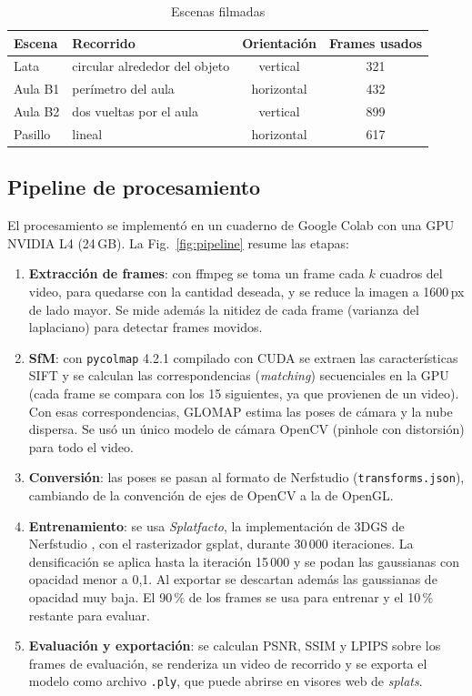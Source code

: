 \documentclass[conference,a4paper]{IEEEtran}
\begin{document}
\begin{table}[htbp]
\caption{Escenas filmadas}
\label{tab:escenas}
\centering
\begin{tabular}{@{}llcc@{}}
\toprule
Escena & Recorrido & Orientación & Frames usados \\
\midrule
Lata     & circular alrededor del objeto & vertical   & 321 \\
Aula B1  & perímetro del aula            & horizontal & 432 \\
Aula B2  & dos vueltas por el aula       & vertical   & 899 \\
Pasillo  & lineal                        & horizontal & 617 \\
\bottomrule
\end{tabular}
\end{table}

\subsection{Pipeline de procesamiento}

El procesamiento se implementó en un cuaderno de Google Colab con una GPU NVIDIA L4 (24\,GB). La Fig.~\ref{fig:pipeline} resume las etapas:

\begin{enumerate}
\item \textbf{Extracción de frames}: con ffmpeg se toma un frame cada $k$ cuadros del video, para quedarse con la cantidad deseada, y se reduce la imagen a 1600\,px de lado mayor. Se mide además la nitidez de cada frame (varianza del laplaciano) para detectar frames movidos.
\item \textbf{SfM}: con \texttt{pycolmap} 4.2.1 compilado con CUDA se extraen las características SIFT y se calculan las correspondencias (\textit{matching}) secuenciales en la GPU (cada frame se compara con los 15 siguientes, ya que provienen de un video). Con esas correspondencias, GLOMAP estima las poses de cámara y la nube dispersa. Se usó un único modelo de cámara OpenCV (pinhole con distorsión) para todo el video.
\item \textbf{Conversión}: las poses se pasan al formato de Nerfstudio (\texttt{transforms.json}), cambiando de la convención de ejes de OpenCV a la de OpenGL.
\item \textbf{Entrenamiento}: se usa \textit{Splatfacto}, la implementación de 3DGS de Nerfstudio \cite{nerfstudio}, con el rasterizador gsplat, durante 30\,000 iteraciones. La densificación se aplica hasta la iteración 15\,000 y se podan las gaussianas con opacidad menor a 0,1. Al exportar se descartan además las gaussianas de opacidad muy baja. El 90\,\% de los frames se usa para entrenar y el 10\,\% restante para evaluar.
\item \textbf{Evaluación y exportación}: se calculan PSNR, SSIM y LPIPS sobre los frames de evaluación, se renderiza un video de recorrido y se exporta el modelo como archivo \texttt{.ply}, que puede abrirse en visores web de \textit{splats}.
\end{enumerate}
\end{document}
